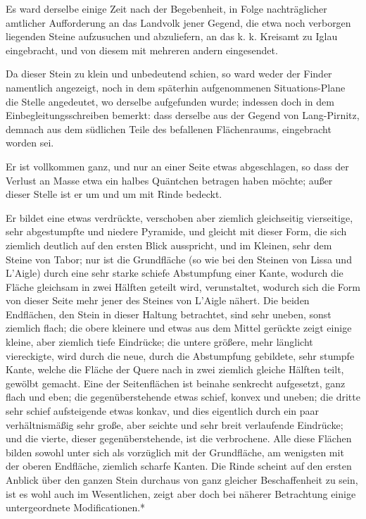 \documentclass[a4paper, 11pt, oneside, german]{article}
\begin{document}
Es ward derselbe einige Zeit nach der Begebenheit, in Folge nachträglicher amtlicher Aufforderung an das Landvolk jener Gegend, die etwa noch verborgen liegenden Steine aufzusuchen und abzuliefern, an das k. k. Kreisamt zu Iglau eingebracht, und von diesem mit mehreren andern eingesendet.

Da dieser Stein zu klein und unbedeutend schien, so ward weder der Finder namentlich angezeigt, noch in dem späterhin aufgenommenen Situations-Plane die Stelle angedeutet, wo derselbe aufgefunden wurde; indessen doch in dem Einbegleitungsschreiben bemerkt: dass derselbe aus der Gegend von Lang-Pirnitz, demnach aus dem südlichen Teile des befallenen Flächenraums, eingebracht worden sei.

Er ist vollkommen ganz, und nur an einer Seite etwas abgeschlagen, so dass der Verlust an Masse etwa ein halbes Quäntchen betragen haben möchte; außer dieser Stelle ist er um und um mit Rinde bedeckt.

Er bildet eine etwas verdrückte, verschoben aber ziemlich gleichseitig vierseitige, sehr abgestumpfte und niedere Pyramide, und gleicht mit dieser Form, die sich ziemlich deutlich auf den ersten Blick ausspricht, und im Kleinen, sehr dem Steine von Tabor; nur ist die Grundfläche (so wie bei den Steinen von Lissa und L'Aigle) durch eine sehr starke schiefe Abstumpfung einer Kante, wodurch die Fläche gleichsam in zwei Hälften geteilt wird, verunstaltet, wodurch sich die Form von dieser Seite mehr jener des Steines von L'Aigle nähert. Die beiden Endflächen, den Stein in dieser Haltung betrachtet, sind sehr uneben, sonst ziemlich flach; die obere kleinere und etwas aus dem Mittel gerückte zeigt einige kleine, aber ziemlich tiefe Eindrücke; die untere größere, mehr länglicht viereckigte, wird durch die neue, durch die Abstumpfung gebildete, sehr stumpfe Kante, welche die Fläche der Quere nach in zwei ziemlich gleiche Hälften teilt, gewölbt gemacht. Eine der Seitenflächen ist beinahe senkrecht aufgesetzt, ganz flach und eben; die gegenüberstehende etwas schief, konvex und uneben; die dritte sehr schief aufsteigende etwas konkav, und dies eigentlich durch ein paar verhältnismäßig sehr große, aber seichte und sehr breit verlaufende Eindrücke; und die vierte, dieser gegenüberstehende, ist die verbrochene. Alle diese Flächen bilden sowohl unter sich als vorzüglich mit der Grundfläche, am wenigsten mit der oberen Endfläche, ziemlich scharfe Kanten. Die Rinde scheint auf den ersten Anblick über den ganzen Stein durchaus von ganz gleicher Beschaffenheit zu sein, ist es wohl auch im Wesentlichen, zeigt aber doch bei näherer Betrachtung einige untergeordnete Modificationen.*
\end{document}
